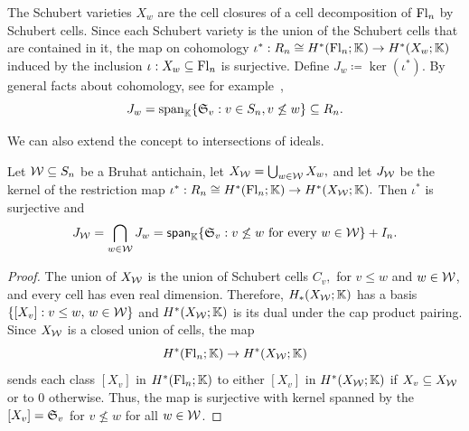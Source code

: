 The Schubert varieties $X_w$ are the cell closures of a cell decomposition of $\mathrm{Fl}_n$ by Schubert cells. Since each Schubert variety is the union of the Schubert cells that are contained in it, the map on cohomology $\iota^*:R_n\cong H^*(\mathrm{Fl}_n;\mathbb{K})\to H^*(X_w;\mathbb{K})$ induced by the inclusion $\iota:X_w\subseteq \mathrm{Fl}_n$ is surjective. Define $J_w\coloneqq \ker(\iota^*)$. By general facts about cohomology, see for example~\cite{ReinerWooYong}, 
\begin{equation}\label{eq: Jw}
J_w = \mathrm{span}_{\mathbb{K}}\{\mathfrak{S}_v:v\in S_n,v\not\leq w\}\subseteq R_n.
\end{equation}

We can also extend the concept to intersections of ideals.
\begin{lemma}
\label{lem: surjective map on homology from flag var to union}
    Let $\mathcal{W}\subseteq S_n$ be a Bruhat antichain, let $X_{\mathcal{W}} = \bigcup_{w\in\mathcal{W}}X_w,$ and let $J_{\mathcal{W}}$ be the kernel of the restriction map $\iota^*:R_n\cong H^*(\mathrm{Fl}_n;\mathbb{K}) \to H^*(X_{\mathcal{W}};\mathbb{K}).$ Then $\iota^*$ is surjective and 
    \[
    J_{\mathcal{W}} = \bigcap_{w\in\mathcal{W}} J_w = \mathsf{span}_{\mathbb{K}}\{\mathfrak{S}_v:v\not\leq w \text{ for every }w\in\mathcal{W}\}+I_n.
    \]
\end{lemma}
\begin{proof}
    The union of $X_{\mathcal{W}}$ is the union of Schubert cells $C_v,$ for $v\leq w$ and $w\in \mathcal{W}$, and every cell has even real dimension. Therefore, $H_*(X_{\mathcal{W}};\mathbb{K})$ has a basis $\{[X_v] : v\leq w,\, w\in \mathcal{W}\}$ and $H^*(X_{\mathcal{W}};\mathbb{K})$ is its dual under the cap product pairing. Since $X_{\mathcal{W}}$ is a closed union of cells, the map
    \[
    H^*(\mathrm{Fl}_n;\mathbb{K})\to H^*(X_{\mathcal{W}};\mathbb{K})
    \]
    sends each class $[X_v]$ in $H^*(\mathrm{Fl}_n;\mathbb{K})$ to either $[X_v]$ in $H^*(X_{\mathcal{W}};\mathbb{K})$ if $X_v\subseteq X_{\mathcal{W}}$ or to $0$ otherwise. Thus, the map is surjective with kernel spanned by the $[X_v]=\mathfrak{S}_v$ for $v\not\leq w$ for all $w\in \mathcal{W}$.
\end{proof}

